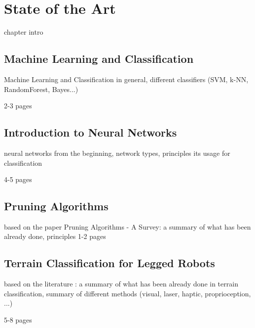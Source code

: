 \chapter{State of the Art}
\label{chapter:01:state_of_the_art}

chapter intro

\section{Machine Learning and Classification}

Machine Learning and Classification in general, different classifiers (SVM, k-NN, RandomForest, Bayes...)

2-3 pages

\section{Introduction to Neural Networks}

neural networks from the beginning, network types, principles its usage for classification

4-5 pages

\section{Pruning Algorithms}

based on the paper Pruning Algorithms - A Survey: a summary of what has been already done, principles 
1-2 pages

\section{Terrain Classification for Legged Robots}

based on the literature : a summary of what has been already done in terrain classification, summary of different methods (visual, laser, haptic, proprioception, ...)

5-8 pages